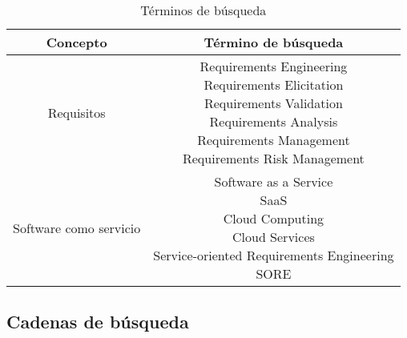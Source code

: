 \documentclass{article}
\begin{document}
\begin{table}[ht]
        \caption{Términos de búsqueda} 
        \centering 
        \begin{tabular}{c c}
                \hline
                Concepto & Término de búsqueda\\ [0.5ex] %
                \hline
                Requisitos             & \makecell{Requirements Engineering \\
                                                   Requirements Elicitation \\
                                                   Requirements Validation \\
                                                   Requirements Analysis \\
                                                   Requirements Management \\
                                                   Requirements Risk Management} \\ 
                \hline 
                Software como servicio & \makecell{Software as a Service \\
                                                   SaaS \\
                                                   Cloud Computing \\
                                                   Cloud Services\\
                                                   Service-oriented Requirements Engineering \\
                                                   SORE } \\[1ex] 
                \hline 
        \end{tabular}
        \label{table:tablaterminos}
\end{table}
\newpage

\subsection{Cadenas de búsqueda}
\end{document}
